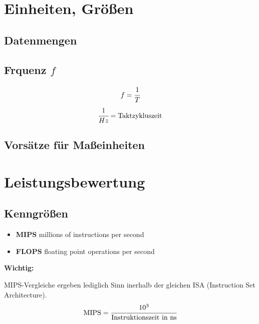 \documentclass
[
	8pt,		%
	ngerman,	%
	a4paper,	%
	landscape,	%
	final		%
]{extarticle}
\newcommand*\important{\par\vspace{\abovedisplayskip}\textbf{Wichtig:}\par}
\begin{document}
\begin{multicols*}{4}
\section{Einheiten, Größen}
\subsection{Datenmengen}
\begin{center}
	
\end{center}
\subsection{Frquenz \(f\)}
\[f = \cfrac{1}{T}\]
\[\cfrac{1}{Hz} = \text{Taktzykluszeit}\]
\subsection{Vorsätze für Maßeinheiten}
\begin{center}
	
\end{center}
\section{Leistungsbewertung}
\subsection{Kenngrößen}
\begin{itemize}
	\item \textbf{MIPS} millions of instructions per second
	\item \textbf{FLOPS} floating point operations per second
\end{itemize}
\important
MIPS-Vergleiche ergeben lediglich Sinn inerhalb der gleichen ISA
(Instruction Set Architecture).
\[\text{MIPS} = \cfrac{10^3}{\text{Instruktionszeit in ns}}\]

\end{multicols*}
\end{document}
